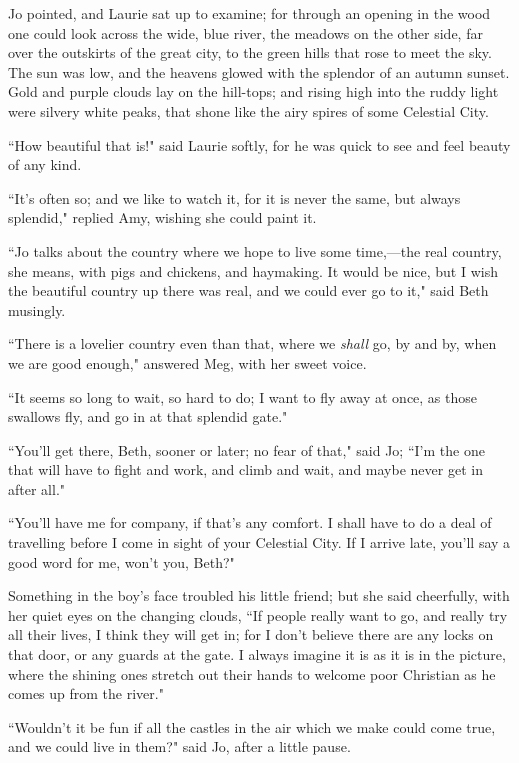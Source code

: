 Jo pointed, and Laurie sat up to examine; for through an opening in the
wood one could look across the wide, blue river, the meadows on the
other side, far over the outskirts of the great city, to the green hills
that rose to meet the sky. The sun was low, and the heavens glowed with
the splendor of an autumn sunset. Gold and purple clouds lay on the
hill-tops; and rising high into the ruddy light were silvery white
peaks, that shone like the airy spires of some Celestial City.

``How beautiful that is!" said Laurie softly, for he was quick to see and
feel beauty of any kind.

``It's often so; and we like to watch it, for it is never
the same, but always splendid," replied Amy, wishing she could paint it.

``Jo talks about the country where we hope to live some time,---the real
country, she means, with pigs and chickens, and haymaking. It would be
nice, but I wish the beautiful country up there was real, and we could
ever go to it," said Beth musingly.

``There is a lovelier country even than that, where we \emph{shall} go,
by and by, when we are good enough," answered Meg, with her sweet voice.

``It seems so long to wait, so hard to do; I want to fly away at once, as
those swallows fly, and go in at that splendid gate."

``You'll get there, Beth, sooner or later; no fear of
that," said Jo; ``I'm the one that will have to fight and
work, and climb and wait, and maybe never get in after all."

``You'll have me for company, if that's
any comfort. I shall have to do a deal of travelling before I come in
sight of your Celestial City. If I arrive late, you'll
say a good word for me, won't you, Beth?"

Something in the boy's face troubled his little friend;
but she said cheerfully, with her quiet eyes on the changing clouds, ``If
people really want to go, and really try all their lives, I think they
will get in; for I don't believe there are any locks on
that door, or any guards at the gate. I always imagine it is as it is in
the picture, where the shining ones stretch out their hands to welcome
poor Christian as he comes up from the river."

``Wouldn't it be fun if all the castles in the air which
we make could come true, and we could live in them?" said Jo, after a
little pause.

